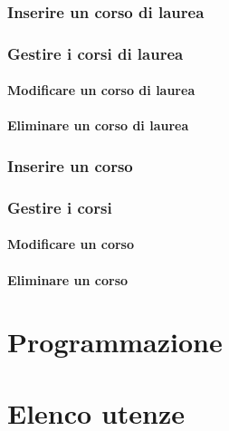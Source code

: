 \documentclass [a4paper,11pt]{book}
\begin{document}
\subsection{Inserire un corso di laurea}

\medskip

\subsection{Gestire i corsi di laurea}

\subsubsection{Modificare un corso di laurea}

\medskip

\subsubsection{Eliminare un corso di laurea}

\medskip

\subsection{Inserire un corso}

\medskip

\subsection{Gestire i corsi}

\subsubsection{Modificare un corso}

\medskip

\subsubsection{Eliminare un corso}

\medskip
\medskip

\chapter{Programmazione}

\chapter{Elenco utenze}
\end{document}
